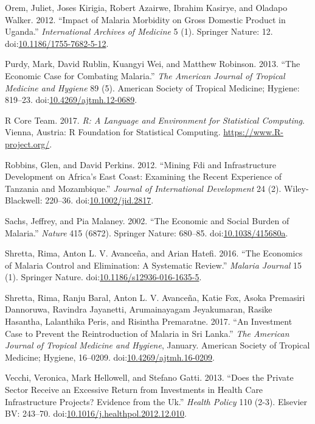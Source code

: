 \documentclass[]{article}
\begin{document}
\hypertarget{ref-Orem_2012}{}
Orem, Juliet, Joses Kirigia, Robert Azairwe, Ibrahim Kasirye, and
Oladapo Walker. 2012. ``Impact of Malaria Morbidity on Gross Domestic
Product in Uganda.'' \emph{International Archives of Medicine} 5 (1).
Springer Nature: 12.
doi:\href{https://doi.org/10.1186/1755-7682-5-12}{10.1186/1755-7682-5-12}.

\hypertarget{ref-Purdy_2013}{}
Purdy, Mark, David Rublin, Kuangyi Wei, and Matthew Robinson. 2013.
``The Economic Case for Combating Malaria.'' \emph{The American Journal
of Tropical Medicine and Hygiene} 89 (5). American Society of Tropical
Medicine; Hygiene: 819--23.
doi:\href{https://doi.org/10.4269/ajtmh.12-0689}{10.4269/ajtmh.12-0689}.

\hypertarget{ref-R}{}
R Core Team. 2017. \emph{R: A Language and Environment for Statistical
Computing}. Vienna, Austria: R Foundation for Statistical Computing.
\url{https://www.R-project.org/}.

\hypertarget{ref-Robbins2012}{}
Robbins, Glen, and David Perkins. 2012. ``Mining Fdi and Infrastructure
Development on Africa's East Coast: Examining the Recent Experience of
Tanzania and Mozambique.'' \emph{Journal of International Development}
24 (2). Wiley-Blackwell: 220--36.
doi:\href{https://doi.org/10.1002/jid.2817}{10.1002/jid.2817}.

\hypertarget{ref-Sachs2002}{}
Sachs, Jeffrey, and Pia Malaney. 2002. ``The Economic and Social Burden
of Malaria.'' \emph{Nature} 415 (6872). Springer Nature: 680--85.
doi:\href{https://doi.org/10.1038/415680a}{10.1038/415680a}.

\hypertarget{ref-Shretta2016}{}
Shretta, Rima, Anton L. V. Avanceña, and Arian Hatefi. 2016. ``The
Economics of Malaria Control and Elimination: A Systematic Review.''
\emph{Malaria Journal} 15 (1). Springer Nature.
doi:\href{https://doi.org/10.1186/s12936-016-1635-5}{10.1186/s12936-016-1635-5}.

\hypertarget{ref-Shretta_2017}{}
Shretta, Rima, Ranju Baral, Anton L. V. Avanceña, Katie Fox, Asoka
Premasiri Dannoruwa, Ravindra Jayanetti, Arumainayagam Jeyakumaran,
Rasike Hasantha, Lalanthika Peris, and Risintha Premaratne. 2017. ``An
Investment Case to Prevent the Reintroduction of Malaria in Sri Lanka.''
\emph{The American Journal of Tropical Medicine and Hygiene}, January.
American Society of Tropical Medicine; Hygiene, 16--0209.
doi:\href{https://doi.org/10.4269/ajtmh.16-0209}{10.4269/ajtmh.16-0209}.

\hypertarget{ref-Vecchi_2013}{}
Vecchi, Veronica, Mark Hellowell, and Stefano Gatti. 2013. ``Does the
Private Sector Receive an Excessive Return from Investments in Health
Care Infrastructure Projects? Evidence from the Uk.'' \emph{Health
Policy} 110 (2-3). Elsevier BV: 243--70.
doi:\href{https://doi.org/10.1016/j.healthpol.2012.12.010}{10.1016/j.healthpol.2012.12.010}.
\end{document}
